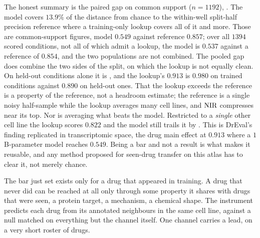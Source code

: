 \begin{claim}
The honest summary is the paired gap on common support ($n = \num{1192}$),
. The model covers $13.9\%$ of the distance from
chance to the within-well split-half precision reference where a training-only
lookup covers all of it and more. Those are common-support figures, model $0.549$
against reference $0.857$; over all $\num{1394}$ scored conditions, not all of
which admit a lookup, the model is $0.537$ against a reference of $0.854$, and
the two populations are not combined. The pooled gap does combine the two sides
of the split, on which the lookup is not equally clean. On held-out conditions
alone it is , and the lookup's $0.913$ is $0.980$ on
trained conditions against $0.890$ on held-out ones. That the lookup exceeds the
reference is a property of the reference, not a headroom estimate; the reference
is a single noisy half-sample while the lookup averages many cell lines, and
$\textrm{NIR}$ compresses near its top. Nor is averaging what beats the model. Restricted
to a \emph{single} other cell line the lookup scores $0.822$ and the model still
trails it by . This is DrEval's finding replicated
in transcriptomic space, the drug main effect at $0.913$ where a $1$B-parameter
model reaches $0.549$. Being a bar and not a result is what makes it reusable,
and any method proposed for seen-drug transfer on this atlas has to clear it, not
merely chance.
\end{claim}


\begin{question}[8]
The bar just set exists only for a drug that appeared in training. A drug that
never did can be reached at all only through some property it shares with drugs
that were seen, a protein target, a mechanism, a chemical shape. The instrument
predicts each drug from its annotated neighbours in the same cell line, against a
null matched on everything but the channel itself. One channel carries a lead, on
a very short roster of drugs.
\end{question}


